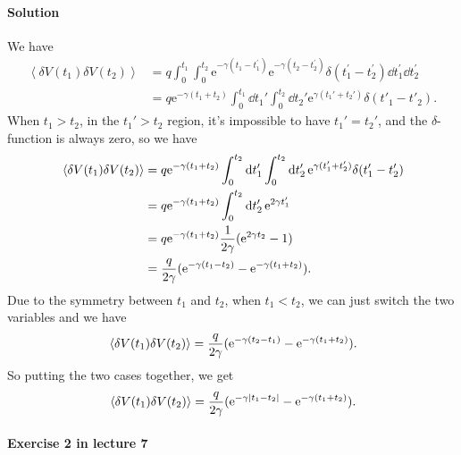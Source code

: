 \documentclass[hyperref, a4paper]{article}
\newcommand*{\ee}{\mathrm{e}}
\begin{document}
\paragraph{Solution} We have 
\[
    \begin{aligned}
        \left\langle\delta V\left(t_1\right) \delta V\left(t_2\right)\right\rangle &= q \int_0^{t_1} \int_0^{t_2} \mathrm{e}^{-\gamma\left(t_1-t_1^{\prime}\right)} \mathrm{e}^{-\gamma\left(t_2-t_2^{\prime}\right)} \delta\left(t_1^{\prime}-t_2^{\prime}\right) \dd t_1^{\prime} \dd t_2^{\prime} \\
        &= q \ee^{- \gamma (t_1 + t_2)} \int_0^{t_1} \dd{t_1'} \int_0^{t_2} \dd{t_2'}
        \ee^{\gamma (t_1' + t_2')} \delta (t'_1 - t'_2). 
    \end{aligned}
\]
When $t_1 > t_2$, in the $t_1' > t_2$ region, 
it's impossible to have $t_1' = t_2'$, and the $\delta$-function is always zero, so we have 
\[
    \begin{aligned}
        \expval*{\delta V(t_1) \delta V(t_2)} &= q \ee^{- \gamma (t_1 + t_2)} 
        \int_{0}^{t_2} \dd{t_1'} \int_0^{t_2} \dd{t_2'} \ee^{\gamma (t_1' + t_2')} \delta (t_1' - t_2')  \\
        &= q \ee^{- \gamma (t_1 + t_2)} \int_0^{t_2} \dd{t_2'} \ee^{2 \gamma t_1'} \\
        &= q \ee^{- \gamma (t_1 + t_2)} \frac{1}{2 \gamma} (\ee^{2 \gamma t_2} - 1) \\
        &= \frac{q}{2 \gamma} (\ee^{- \gamma (t_1 - t_2)} - \ee^{- \gamma (t_1 + t_2)}).
    \end{aligned}
\] 
Due to the symmetry between $t_1$ and $t_2$,
when $t_1 < t_2$, we can just switch the two variables and we have 
\[
    \expval*{\delta V(t_1) \delta V(t_2)} = 
    \frac{q}{2 \gamma} (\ee^{- \gamma (t_2 - t_1)} - \ee^{- \gamma (t_1 + t_2)}).
\]
So putting the two cases together, we get 
\begin{equation}
    \expval*{\delta V(t_1) \delta V(t_2)} = 
    \frac{q}{2 \gamma} (\ee^{- \gamma \abs{t_1 - t_2}} - \ee^{- \gamma (t_1 + t_2)}).
\end{equation}

\paragraph{Exercise 2 in lecture 7}
\end{document}
